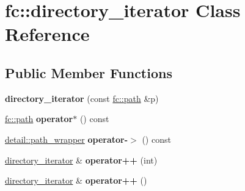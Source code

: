 \hypertarget{classfc_1_1directory__iterator}{}\section{fc\+:\+:directory\+\_\+iterator Class Reference}
\label{classfc_1_1directory__iterator}
\subsection*{Public Member Functions}
\begin{DoxyCompactItemize}
\item 
\mbox{\label{classfc_1_1directory__iterator_a5201c83d6567151f308c292b2fbb3665}} 
{\bfseries directory\+\_\+iterator} (const \mbox{\hyperlink{classfc_1_1path}{fc\+::path}} \&p)
\item 
\mbox{\label{classfc_1_1directory__iterator_ad06ef6b54ef483d56672d8d8bddd5e26}} 
\mbox{\hyperlink{classfc_1_1path}{fc\+::path}} {\bfseries operator$\ast$} () const
\item 
\mbox{\label{classfc_1_1directory__iterator_aea174ce25dce1bae67c9dab956cc5750}} 
\mbox{\hyperlink{classfc_1_1detail_1_1path__wrapper}{detail\+::path\+\_\+wrapper}} {\bfseries operator-\/$>$} () const
\item 
\mbox{\label{classfc_1_1directory__iterator_a4e372b3729bd88b0801f5c50bb0bb07a}} 
\mbox{\hyperlink{classfc_1_1directory__iterator}{directory\+\_\+iterator}} \& {\bfseries operator++} (int)
\item 
\mbox{\label{classfc_1_1directory__iterator_a0644796a19c7ff77406a898230c2c029}} 
\mbox{\hyperlink{classfc_1_1directory__iterator}{directory\+\_\+iterator}} \& {\bfseries operator++} ()
\end{DoxyCompactItemize}
